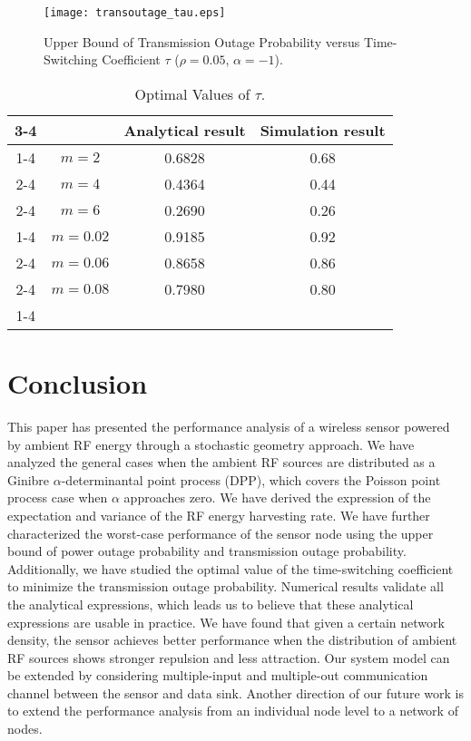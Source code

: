 \documentclass[12pt,draftclsnofoot,onecolumn]{IEEEtran}
\begin{document}
\begin{figure}
\centering
\texttt{[image: transoutage\_tau.eps]}
\caption{Upper Bound of Transmission Outage Probability versus Time-Switching Coefficient $\tau$ ($\rho=0.05$, $\alpha=-1$).} \label{fig:Transoutage_tau}
\end{figure}    
 


\begin{table}
\centering 
\caption{\footnotesize Optimal Values of $\tau$.} \label{Optimal_tau}
\begin{tabular}{cc|c|c|}
\cline{3-4}
& & Analytical result & Simulation result  \\ 
\cline{1-4}
\multicolumn{1}{ |c| }{\multirow{3}{*}{$\xi=0$} } & $ m=2 $ & 0.6828  &  0.68   \\ 
\cline{2-4}
\multicolumn{1}{ |c|  }{}    & $m=4$ &   0.4364  &   0.44 
  \\ 
\cline{2-4}
\multicolumn{1}{ |c|  }{}    &  $m=6$  &   0.2690  &   0.26     \\ 
\cline{1-4}
\multicolumn{1}{ |c|  }{\multirow{3}{*}{$\xi=1$}}   &  $m=0.02$  &   0.9185  & 0.92  \\ 
\cline{2-4}
\multicolumn{1}{ |c|  }{}   &  $m=0.06$   &    
0.8658  &  0.86        \\ 
\cline{2-4}
\multicolumn{1}{ |c|  }{}   &  $m=0.08$  &  0.7980   &     0.80   \\ 
\cline{1-4}
\end{tabular}  
\centering
\end{table}

\section{Conclusion}
\label{sec:conclusion}
This paper has presented the performance analysis of a wireless sensor powered by ambient RF energy through a stochastic geometry approach. We have analyzed the general cases when the ambient RF sources are distributed as a Ginibre $\alpha$-determinantal point process (DPP), which covers the Poisson point process case when $\alpha$ approaches zero. We  have derived the expression of the expectation and variance of the RF energy harvesting rate. We have further characterized the worst-case performance of the sensor node using the upper bound of power outage probability and transmission outage probability. Additionally, we have studied the optimal value of the time-switching coefficient to minimize the transmission outage probability. Numerical results validate all the analytical expressions, which leads us to believe that these analytical expressions are usable in practice. We have found that given a certain network density, the sensor achieves better performance when the distribution of ambient RF sources shows stronger repulsion and less attraction. Our system model can be extended by considering multiple-input and multiple-out communication channel between the sensor and data sink. Another direction of our future work is to extend the performance analysis from an individual node level to a network of nodes. 
\end{document}
